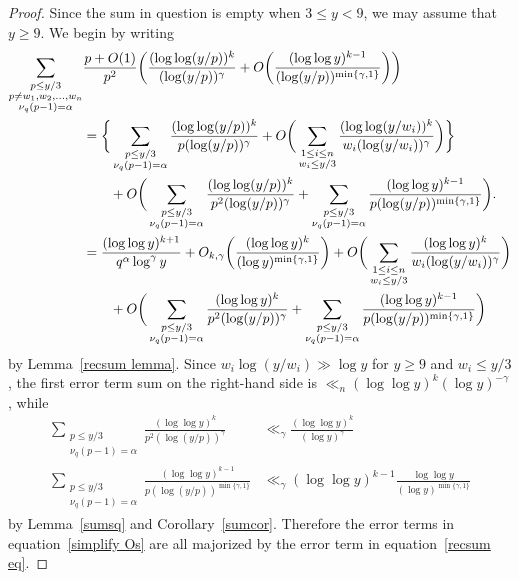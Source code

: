 \documentclass[12pt,reqno]{amsart}
\theoremstyle{definition}
\begin{document}
\begin{proof}
Since the sum in question is empty when $3\le y<9$, we may assume that $y\ge9$.
We begin by writing
\begin{align}
\sum_{\substack{p\le y/3\\ p\ne w_1,w_2,\ldots, w_n \\ \nu_q(p-1)=\alpha}} & \frac{p+O(1)}{p^2} \bigg(\frac{(\log\log(y/p))^k}{(\log(y/p))^\gamma} + O\bigg( \frac {(\log\log y)^{k-1}}{(\log(y/p))^{\min\{\gamma,1\}}}\bigg) \bigg) \notag \\
&= \bigg\{ \sum_{\substack{p\le y/3\\ \nu_q(p-1)=\alpha}}\frac{(\log\log(y/p))^k}{p(\log(y/p))^\gamma}+O\bigg( \sum_{\substack{1\le i\le n \\ w_i \le y/3}} \frac{(\log\log(y/w_i))^k}{w_i(\log(y/w_i))^\gamma} \bigg) \bigg\} \notag \\
&\qquad{}+ O\bigg(\sum_{\substack{p\le y/3 \\ \nu_q(p-1)=\alpha}}\frac{(\log\log(y/p))^k}{p^2(\log(y/p))^\gamma} + \sum_{\substack{p\le y/3 \\ \nu_q(p-1)=\alpha}}\frac {(\log\log y)^{k-1}}{p(\log(y/p))^{\min\{\gamma,1\}}}\bigg). \notag \\
&= \frac{(\log\log y)^{k+1}}{q^\alpha\log^\gamma{y}}+O_{k,\gamma}\bigg( \frac{(\log\log y)^k}{(\log y)^{\min\{\gamma,1\}}}\bigg) +O\bigg( \sum_{\substack{1\le i\le n \\ w_i \le y/3}} \frac{(\log\log y)^k}{w_i(\log(y/w_i))^\gamma} \bigg) \label{simplify Os} \\
&\qquad{}+ O\bigg(\sum_{\substack{p\le y/3 \\ \nu_q(p-1)=\alpha}}\frac{(\log\log y)^k}{p^2(\log(y/p))^\gamma} + \sum_{\substack{p\le y/3 \\ \nu_q(p-1)=\alpha}}\frac {(\log\log y)^{k-1}}{p(\log(y/p))^{\min\{\gamma,1\}}}\bigg) \notag
\end{align}
by Lemma~\ref{recsum lemma}.
Since $w_i \log(y/w_i) \gg \log y$ for $y\ge9$ and $w_i\le y/3$, the first error term sum on the right-hand side is $\ll_n (\log \log y)^k (\log y)^{-\gamma}$, while
\begin{align*}
\sum_{\substack{p\le y/3 \\ \nu_q(p-1)=\alpha}}\frac{(\log\log y)^k}{p^2(\log(y/p))^\gamma} &\ll_\gamma \frac{(\log\log y)^k}{(\log y)^\gamma} \\
\sum_{\substack{p\le y/3 \\ \nu_q(p-1)=\alpha}} \frac {(\log\log y)^{k-1}}{p(\log(y/p))^{\min\{\gamma,1\}}} &\ll_\gamma (\log\log y)^{k-1}\frac{\log\log y}{(\log y)^{\min\{\gamma,1\}}}
\end{align*}
by Lemma~\ref{sumsq} and Corollary~\ref{sumcor}. Therefore the error terms in equation~\eqref{simplify Os} are all majorized by the error term in equation~\eqref{recsum eq}.
\end{proof}
\end{document}
